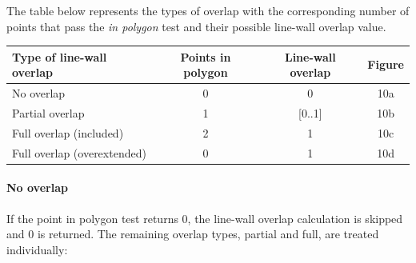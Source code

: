 \documentclass[10pt]{article}
\begin{document}
{	The table below represents the types of overlap with the corresponding number of points
	that pass the \emph{in polygon} test and their possible line-wall overlap
	value.\\ 

	\begin{tabular}{|l||c|c|c|}
	\hline
	Type of line-wall overlap 			&	Points in polygon 			& Line-wall overlap & Figure \\
	\hline
	\hline
	No overlap					&	0					& 0		& 10a\\
	\hline
	Partial overlap 				&	1					& [0..1]	& 10b\\
	\hline
	Full overlap (included)		&	2					& 1		& 10c\\
	\hline
	Full overlap (overextended)		&  	0					& 1 		& 10d\\
	\hline
	\end{tabular}

	\paragraph{No overlap}
	If the point in polygon test returns 0, the line-wall overlap calculation
	is skipped and 0 is returned. The remaining overlap types, partial and full,
	are treated individually:\\



}
\end{document}
